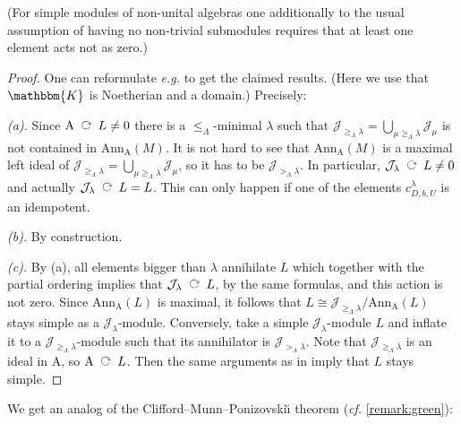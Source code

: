 \documentclass[a4paper,11pt]{amsart}
\newcommand{\eg}{\textsl{e.g.}}
\newcommand{\cf}{\textsl{cf.}}
\newcommand{\actsleft}{\mathop{\,\;\raisebox{1.7ex}{\rotatebox{-90}{$\circlearrowright$}}\;\,}}
\newcommand{\setstuff}[1]{\mathrm{#1}}
\newcommand{\KK}{\mathbbm{K}}
\numberwithin{equation}{section}
\let\fullref\autoref
\begin{document}
(For simple modules of non-unital algebras one additionally 
to the usual assumption of having no non-trivial submodules 
requires that at least one element acts not as zero.)

\begin{proof}
One can reformulate {\eg} \cite[Corollary 3.2]{KoXi-affine-cellular} 
to get the claimed results. (Here we use that $\KK$ is 
Noetherian and a domain.) Precisely:	

\textit{(a).} Since $\setstuff{A}\actsleft L\neq 0$ there 
is a $\leq_{\Lambda}$-minimal $\lambda$ such that 
$\mathcal{J}_{{\geq_{\Lambda}}\lambda}=
\bigcup_{\mu\geq_{\Lambda}\lambda}\mathcal{J}_{\mu}$ is not contained
in $\mathrm{Ann}_{\setstuff{A}}(M)$.
It is not hard to see 
that $\mathrm{Ann}_{\setstuff{A}}(M)$ is a maximal 
left ideal of $\mathcal{J}_{{\geq_{\Lambda}}\lambda}=
\bigcup_{\mu\geq_{\Lambda}\lambda}\mathcal{J}_{\mu}$, so it has to 
be $\mathcal{J}_{{>_{\Lambda}}\lambda}$. In particular, 
$\mathcal{J}_{\lambda}\actsleft L\neq 0$ and actually 
$\mathcal{J}_{\lambda}\actsleft L=L$. This can only happen 
if one of the elements $c_{D,b,U}^{\lambda}$ is an idempotent.

\textit{(b).} By construction.

\textit{(c).} By (a), all elements bigger than $\lambda$ 
annihilate $L$ which together with the partial ordering 
implies that $\mathcal{J}_{\lambda}\actsleft L$, by the same formulas, 
and this action is not zero. Since $\mathrm{Ann}_{\setstuff{A}}(L)$ 
is maximal, it follows that 
$L\cong\mathcal{J}_{{\geq_{\Lambda}}\lambda}/\mathrm{Ann}_{\setstuff{A}}(L)$
stays simple as a $\mathcal{J}_{\lambda}$-module.
Conversely, take a simple $\mathcal{J}_{\lambda}$-module $L$ 
and inflate it to a $\mathcal{J}_{{\geq_{\Lambda}}\lambda}$-module 
such that its annihilator is $\mathcal{J}_{{>_{\Lambda}}\lambda}$. 
Note that $\mathcal{J}_{{\geq_{\Lambda}}\lambda}$ is an ideal in 
$\setstuff{A}$, so $\setstuff{A}\actsleft L$.
Then the same arguments as in \cite[Lemma 3.1]{KoXi-affine-cellular} 
imply that $L$ stays simple.
\end{proof}

We get an analog of the Clifford--Munn--Ponizovski\u{\i} theorem ({\cf} 
\fullref{remark:green}):
\end{document}
